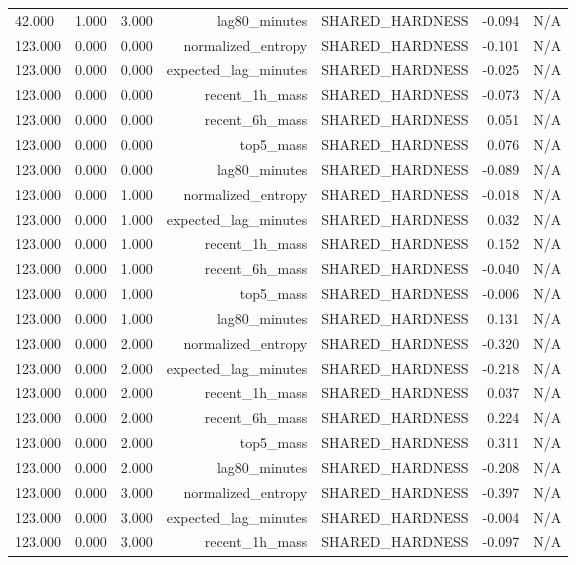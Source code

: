 \begin{table}[h!]
\begin{tabular}{lrrrrrr}
42.000 & 1.000 & 3.000 & lag80\_minutes & SHARED\_HARDNESS & -0.094 & N/A \\
123.000 & 0.000 & 0.000 & normalized\_entropy & SHARED\_HARDNESS & -0.101 & N/A \\
123.000 & 0.000 & 0.000 & expected\_lag\_minutes & SHARED\_HARDNESS & -0.025 & N/A \\
123.000 & 0.000 & 0.000 & recent\_1h\_mass & SHARED\_HARDNESS & -0.073 & N/A \\
123.000 & 0.000 & 0.000 & recent\_6h\_mass & SHARED\_HARDNESS & 0.051 & N/A \\
123.000 & 0.000 & 0.000 & top5\_mass & SHARED\_HARDNESS & 0.076 & N/A \\
123.000 & 0.000 & 0.000 & lag80\_minutes & SHARED\_HARDNESS & -0.089 & N/A \\
123.000 & 0.000 & 1.000 & normalized\_entropy & SHARED\_HARDNESS & -0.018 & N/A \\
123.000 & 0.000 & 1.000 & expected\_lag\_minutes & SHARED\_HARDNESS & 0.032 & N/A \\
123.000 & 0.000 & 1.000 & recent\_1h\_mass & SHARED\_HARDNESS & 0.152 & N/A \\
123.000 & 0.000 & 1.000 & recent\_6h\_mass & SHARED\_HARDNESS & -0.040 & N/A \\
123.000 & 0.000 & 1.000 & top5\_mass & SHARED\_HARDNESS & -0.006 & N/A \\
123.000 & 0.000 & 1.000 & lag80\_minutes & SHARED\_HARDNESS & 0.131 & N/A \\
123.000 & 0.000 & 2.000 & normalized\_entropy & SHARED\_HARDNESS & -0.320 & N/A \\
123.000 & 0.000 & 2.000 & expected\_lag\_minutes & SHARED\_HARDNESS & -0.218 & N/A \\
123.000 & 0.000 & 2.000 & recent\_1h\_mass & SHARED\_HARDNESS & 0.037 & N/A \\
123.000 & 0.000 & 2.000 & recent\_6h\_mass & SHARED\_HARDNESS & 0.224 & N/A \\
123.000 & 0.000 & 2.000 & top5\_mass & SHARED\_HARDNESS & 0.311 & N/A \\
123.000 & 0.000 & 2.000 & lag80\_minutes & SHARED\_HARDNESS & -0.208 & N/A \\
123.000 & 0.000 & 3.000 & normalized\_entropy & SHARED\_HARDNESS & -0.397 & N/A \\
123.000 & 0.000 & 3.000 & expected\_lag\_minutes & SHARED\_HARDNESS & -0.004 & N/A \\
123.000 & 0.000 & 3.000 & recent\_1h\_mass & SHARED\_HARDNESS & -0.097 & N/A \\

\end{tabular}
\end{table}
